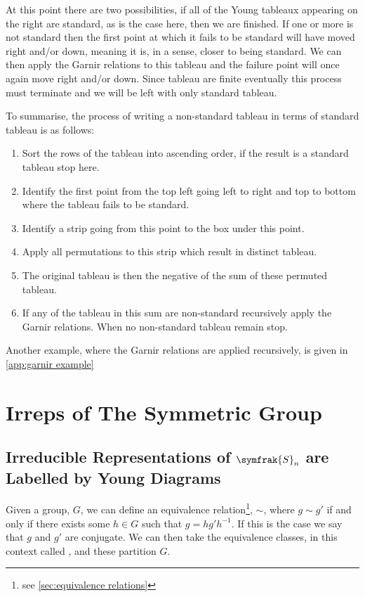 \documentclass[fleqn]{NotesClass}
\newcommand{\symmetricGroup}[1][n]{\symfrak{S}_{#1}}
\begin{document}
    At this point there are two possibilities, if all of the Young tableaux appearing on the right are standard, as is the case here, then we are finished.
    If one or more is not standard then the first point at which it fails to be standard will have moved right and/or down, meaning it is, in a sense, closer to being standard.
    We can then apply the Garnir relations to this tableau and the failure point will once again move right and/or down.
    Since tableau are finite eventually this process must terminate and we will be left with only standard tableau.
    
    To summarise, the process of writing a non-standard tableau in terms of standard tableau is as follows:
    \begin{enumerate}
        \item Sort the rows of the tableau into ascending order, if the result is a standard tableau stop here.
        \item Identify the first point from the top left going left to right and top to bottom where the tableau fails to be standard.
        \item Identify a strip going from this point to the box under this point.
        \item Apply all permutations to this strip which result in distinct tableau.
        \item The original tableau is then the negative of the sum of these permuted tableau.
        \item If any of the tableau in this sum are non-standard recursively apply the Garnir relations.
        When no non-standard tableau remain stop.
    \end{enumerate}
    Another example, where the Garnir relations are applied recursively, is given in \cref{app:garnir example}
    
    \chapter{Irreps of The Symmetric Group}
    \section{Irreducible Representations of \texorpdfstring{\(\symmetricGroup\)}{Sn} are Labelled by Young Diagrams}\label{sec:irreps of Sn labelled by Young diagrams}
    Given a group, \(G\), we can define an equivalence relation\footnote{see \cref{sec:equivalence relations}}, \(\sim\), where \(g \sim g'\) if and only if there exists some \(h \in G\) such that \(g = hg'h^{-1}\).
    If this is the case we say that \(g\) and \(g'\) are conjugate.
    We can then take the equivalence classes, in this context called , and these partition \(G\).
    
\end{document}
